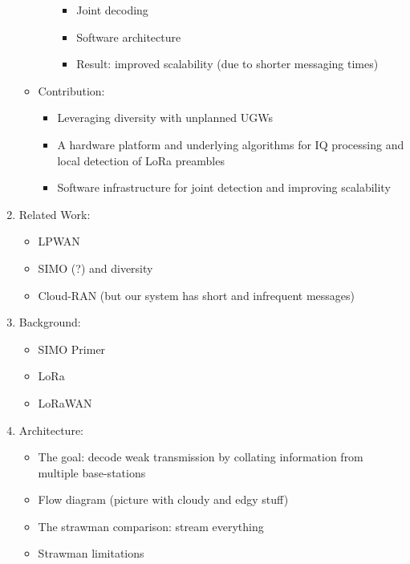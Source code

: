 \begin{enumerate}
\begin{itemize}
\begin{itemize}
\begin{itemize}
                            \item Joint decoding
                            \item Software architecture
                            \item Result: improved scalability (due to shorter messaging times)
                        \end{itemize}
                \end{itemize}
            \item Contribution:
                \begin{itemize}
                    \item Leveraging diversity with unplanned UGWs
                    \item A hardware platform and underlying algorithms for IQ processing and local detection of LoRa preambles
                    \item Software infrastructure for joint detection and improving scalability
                \end{itemize}
        \end{itemize}
    \item Related Work:
        \begin{itemize}
            \item LPWAN
            \item SIMO (?) and diversity
            \item Cloud-RAN (but our system has short and infrequent messages)
        \end{itemize}
    \item Background:
        \begin{itemize}
            \item SIMO Primer
            \item LoRa
            \item LoRaWAN
        \end{itemize}
    \item Architecture:
        \begin{itemize}
            \item The goal: decode weak transmission by collating information from multiple base-stations
            \item Flow diagram (picture with cloudy and edgy stuff)
            \item The strawman comparison: stream everything
            \item Strawman limitations
                \begin{itemize}

\end{itemize}
\end{itemize}
\end{enumerate}
